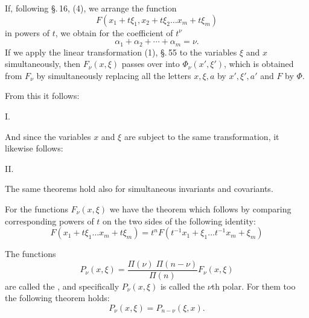 
If, following \S.\,16, (4), we arrange the function
\[
F(x_1 + t\xi_1, x_2 + t\xi_2 \ldots x_m + t\xi_m)
\]
in powers of $t$, we obtain for the coefficient of $t^\nu$
\[
\alpha_1 + \alpha_2 + \cdots + \alpha_m = \nu.
\]
If we apply the linear transformation (1), \S.\,55 to the variables
$\xi$ and $x$ simultaneously, then $F_\nu(x,\xi)$ passes over into $\Phi_\nu(x',\xi')$,
which is obtained from $F_\nu$ by simultaneously replacing all the letters
$x, \xi, a$ by $x', \xi', a'$ and $F$ by $\Phi$.

From this it follows:

I. 

And since the variables $x$ and $\xi$ are subject to the same
transformation, it likewise follows:

II. 

The same theorems hold also for simultaneous invariants
and covariants.

For the functions $F_\nu(x,\xi)$ we have the theorem
which follows by comparing corresponding powers of $t$
on the two sides of the following identity:
\[
F(x_1+t\xi_1\ldots x_m+t\xi_m) = t^n F(t^{-1}x_1+\xi_1\ldots t^{-1}x_m+\xi_m)
\]

The functions
\[
P_\nu(x,\xi) = \frac{\Pi(\nu)\;\Pi(n-\nu)}{\Pi(n)}F_\nu(x,\xi)
\]
are called the , and specifically
$P_\nu(x,\xi)$ is called the $\nu$th polar. For them too the following theorem holds:
\[
P_\nu(x,\xi) = P_{n-\nu}(\xi,x).
\]
